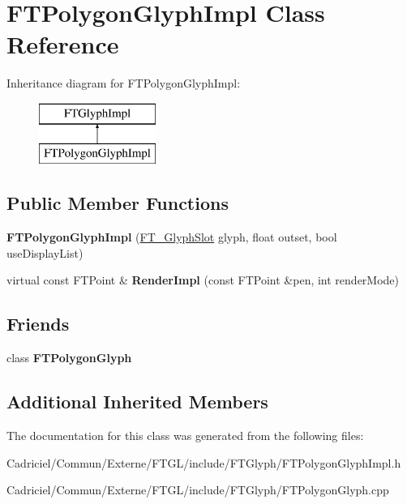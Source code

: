 \hypertarget{class_f_t_polygon_glyph_impl}{}\section{F\+T\+Polygon\+Glyph\+Impl Class Reference}
\label{class_f_t_polygon_glyph_impl}
Inheritance diagram for F\+T\+Polygon\+Glyph\+Impl\+:\begin{figure}[H]
\begin{center}
\leavevmode
\includegraphics[height=2.000000cm]{class_f_t_polygon_glyph_impl}
\end{center}
\end{figure}
\subsection*{Public Member Functions}
\begin{DoxyCompactItemize}
\item 
{\bfseries F\+T\+Polygon\+Glyph\+Impl} (\hyperlink{struct_f_t___glyph_slot_rec__}{F\+T\+\_\+\+Glyph\+Slot} glyph, float outset, bool use\+Display\+List)\hypertarget{class_f_t_polygon_glyph_impl_ab302277a0e76adf9570f1ef9f9ae851f}{}\label{class_f_t_polygon_glyph_impl_ab302277a0e76adf9570f1ef9f9ae851f}

\item 
virtual const F\+T\+Point \& {\bfseries Render\+Impl} (const F\+T\+Point \&pen, int render\+Mode)\hypertarget{class_f_t_polygon_glyph_impl_af689ff9cecc738d292d494bf83adca39}{}\label{class_f_t_polygon_glyph_impl_af689ff9cecc738d292d494bf83adca39}

\end{DoxyCompactItemize}
\subsection*{Friends}
\begin{DoxyCompactItemize}
\item 
class {\bfseries F\+T\+Polygon\+Glyph}\hypertarget{class_f_t_polygon_glyph_impl_a0e33f7bc34e1097f8f9adcb6252d1bc0}{}\label{class_f_t_polygon_glyph_impl_a0e33f7bc34e1097f8f9adcb6252d1bc0}

\end{DoxyCompactItemize}
\subsection*{Additional Inherited Members}


The documentation for this class was generated from the following files\+:\begin{DoxyCompactItemize}
\item 
Cadriciel/\+Commun/\+Externe/\+F\+T\+G\+L/include/\+F\+T\+Glyph/F\+T\+Polygon\+Glyph\+Impl.\+h\item 
Cadriciel/\+Commun/\+Externe/\+F\+T\+G\+L/include/\+F\+T\+Glyph/F\+T\+Polygon\+Glyph.\+cpp\end{DoxyCompactItemize}
